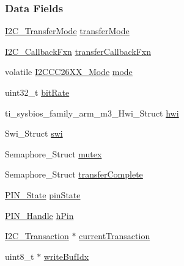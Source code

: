 \subsubsection*{Data Fields}
\begin{DoxyCompactItemize}
\item 
\hyperlink{_i2_c_8h_a39f3b9340fc4ee241b0d2da9b2841c26}{I2\+C\+\_\+\+Transfer\+Mode} \hyperlink{struct_i2_c_c_c26_x_x___object_a64cd64cf328013bebacf75feaa17f127}{transfer\+Mode}
\item 
\hyperlink{_i2_c_8h_aa7389002843eba77425c73b441358fd1}{I2\+C\+\_\+\+Callback\+Fxn} \hyperlink{struct_i2_c_c_c26_x_x___object_ad8faa83bb84c09307294134d9fd9d454}{transfer\+Callback\+Fxn}
\item 
volatile \hyperlink{_i2_c_c_c26_x_x_8h_a9deb519e150efd12ccf7068efca5ee75}{I2\+C\+C\+C26\+X\+X\+\_\+\+Mode} \hyperlink{struct_i2_c_c_c26_x_x___object_a5d9b9f0f08afda1776a2f3caa155bda5}{mode}
\item 
uint32\+\_\+t \hyperlink{struct_i2_c_c_c26_x_x___object_a8544e07d83b25c67b957c58a9a0e4317}{bit\+Rate}
\item 
ti\+\_\+sysbios\+\_\+family\+\_\+arm\+\_\+m3\+\_\+\+Hwi\+\_\+\+Struct \hyperlink{struct_i2_c_c_c26_x_x___object_a759e20bc1c388f73638963c20d99cd09}{hwi}
\item 
Swi\+\_\+\+Struct \hyperlink{struct_i2_c_c_c26_x_x___object_ad2b9894e5a50937969119d6c0bdd6c01}{swi}
\item 
Semaphore\+\_\+\+Struct \hyperlink{struct_i2_c_c_c26_x_x___object_a84660b6df95d3cad705c774609f4e29f}{mutex}
\item 
Semaphore\+\_\+\+Struct \hyperlink{struct_i2_c_c_c26_x_x___object_a98865f00b814edcc3480e64e55f8405d}{transfer\+Complete}
\item 
\hyperlink{_p_i_n_8h_a36ef69d50df6baa6973482669c24a522}{P\+I\+N\+\_\+\+State} \hyperlink{struct_i2_c_c_c26_x_x___object_a704aa1b1fcd1bda23ad73fdda1890e63}{pin\+State}
\item 
\hyperlink{_p_i_n_8h_afb2de52b054638f63c39df1f30a0d88d}{P\+I\+N\+\_\+\+Handle} \hyperlink{struct_i2_c_c_c26_x_x___object_a0e76cc62b6f3080f864ae24ea3e53dd9}{h\+Pin}
\item 
\hyperlink{struct_i2_c___transaction}{I2\+C\+\_\+\+Transaction} $\ast$ \hyperlink{struct_i2_c_c_c26_x_x___object_aa14b9975af2982d7c84646b91c1a6ad5}{current\+Transaction}
\item 
uint8\+\_\+t $\ast$ \hyperlink{struct_i2_c_c_c26_x_x___object_a8175be0691405f4398d2734492e534ed}{write\+Buf\+Idx}
\item 

\end{DoxyCompactItemize}
